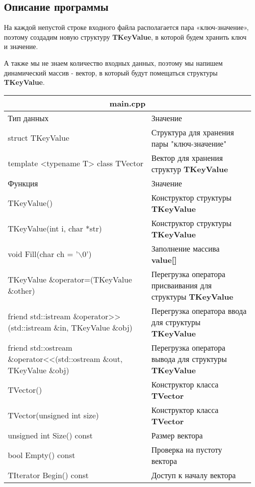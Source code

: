 \documentclass[12pt]{article}
\begin{document}
\subsection*{Описание программы}

На каждой непустой строке входного файла располагается пара «ключ-значение»,
поэтому создадим новую структуру \textbf{TKeyValue}, в которой будем хранить ключ и значение.

А также мы не знаем количество входных данных, поэтому мы напишем динамический массив - вектор, в который будут помещаться структуры \textbf{TKeyValue}.
\begin{table}[!htb]
\begin{tabular}{|m{8cm}|m{8cm}|}
\hline
\multicolumn{2}{|c|}{main.cpp} \\ 
\hline
\cellcolor{gray!25} Тип данных       & \cellcolor{gray!25} Значение\\ 
\hline
struct TKeyValue & Структура для хранения пары "ключ-значение" \\ 
\hline
template <typename T> class TVector & Вектор для хранения структур \textbf{TKeyValue}\\
\hline
\cellcolor{gray!25} Функция & \cellcolor{gray!25}Значение\\
\hline
TKeyValue() & Конструктор структуры \textbf{TKeyValue}\\
\hline
TKeyValue(int i, char *str) & Конструктор структуры \textbf{TKeyValue}\\
\hline
void Fill(char ch = '$\backslash$0') & Заполнение массива \textbf{value[]}\\
\hline
TKeyValue \&operator=(TKeyValue \&other) & Перегрузка оператора присваивания для структуры \textbf{TKeyValue}\\
\hline
friend std::istream \&operator>> (std::istream \&in, TKeyValue \&obj) & Перегрузка оператора ввода для структуры \textbf{TKeyValue}\\
\hline
friend std::ostream \&operator<<(std::ostream \&out, TKeyValue \&obj) &Перегрузка оператора вывода для структуры \textbf{TKeyValue}\\
\hline
TVector() & Конструктор класса \textbf{TVector} \\
\hline
TVector(unsigned int size) & Конструктор класса \textbf{TVector} \\
\hline
unsigned int Size() const & Размер вектора \\
\hline
bool Empty() const & Проверка на пустоту вектора \\
\hline
TIterator Begin() const & Доступ к началу вектора \\

\end{tabular}
\end{table}
\end{document}
